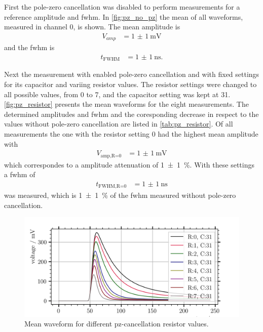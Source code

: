 First the pole-zero cancellation was disabled to perform measurements for a reference amplitude and \ac{fwhm}.
In \autoref{fig:pz_no_pz} the mean of all waveforms, measured in channel 0, is shown.
The mean amplitude is 
\begin{align}
    V_{amp} &= \SI{1(1)}{\milli\volt}
\end{align}
and the \ac{fwhm} is
\begin{align}
    t_\text{FWHM} &= \SI{1(1)}{\nano\second}.
\end{align}

Next the measurement with enabled pole-zero cancellation and with fixed settings for its capacitor and variing resistor values.
The resistor settings were changed to all possible values, from 0 to 7, and the capacitor setting was kept at 31.
\autoref{fig:pz_resistor} presents the mean waveforms for the eight measurements.
The determined amplitudes and \ac{fwhm} and the coresponding decrease in respect to the values without pole-zero cancellation are listed in \autoref{tab:pz_resistor}.
Of all measurements the one with the resistor setting 0 had the highest mean amplitude with 
\begin{align}
    V_\text{amp,R=0} &= \SI{1(1)}{\milli\volt}
\end{align}
which correspondes to a amplitude attenuation of \SI{1(1)}{\percent}.
With these settings a \ac{fwhm} of
\begin{align}
    t_\text{FWHM,R=0} &= \SI{1(1)}{\nano\second}
\end{align}
was measured, which is \SI{1(1)}{\percent} of the \ac{fwhm} measured without pole-zero cancellation.
\begin{figure}
	\centering
	\includegraphics[width=1.\textwidth]{pictures/pz_resistor.png}
	\caption[Mean waveform for different pz-cancellation resistor values.]{Mean waveform for different pz-cancellation resistor values.}
	\label{fig:pz_resistor}
\end{figure}

